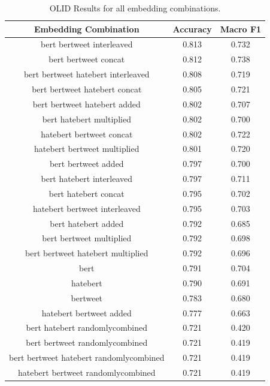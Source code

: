 \documentclass{article} %
\begin{document}
\begin{table}[htbp]
\begin{center}
    \begin{tabular}{|c|c|c|}
    \hline
    Embedding Combination & Accuracy & Macro F1\\
    \hline \hline
    bert bertweet interleaved                &     0.813 &     0.732 \\ \hline
    bert bertweet concat                     &     0.812 &     0.738 \\ \hline
    bert bertweet hatebert interleaved       &     0.808 &     0.719 \\ \hline
    bert bertweet hatebert concat            &     0.805 &     0.721 \\ \hline
    bert bertweet hatebert added             &     0.802 &     0.707 \\ \hline
    bert hatebert multiplied                 &     0.802 &     0.700 \\ \hline
    hatebert bertweet concat                 &     0.802 &     0.722 \\ \hline
    hatebert bertweet multiplied             &     0.801 &     0.720 \\ \hline
    bert bertweet added                      &     0.797 &     0.700 \\ \hline
    bert hatebert interleaved                &     0.797 &     0.711 \\ \hline
    bert hatebert concat                     &     0.795 &     0.702 \\ \hline
    hatebert bertweet interleaved            &     0.795 &     0.703 \\ \hline
    bert hatebert added                      &     0.792 &     0.685 \\ \hline
    bert bertweet multiplied                 &     0.792 &     0.698 \\ \hline
    bert bertweet hatebert multiplied        &     0.792 &     0.696 \\ \hline
    bert                                     &     0.791 &     0.704 \\ \hline
    hatebert                                 &     0.790 &     0.691 \\ \hline
    bertweet                                 &     0.783 &     0.680 \\ \hline
    hatebert bertweet added                  &     0.777 &     0.663 \\ \hline
    bert hatebert randomlycombined           &     0.721 &     0.420 \\ \hline
    bert bertweet randomlycombined           &     0.721 &     0.419 \\ \hline
    bert bertweet hatebert randomlycombined  &     0.721 &     0.419 \\ \hline
    hatebert bertweet randomlycombined       &     0.721 &     0.419 \\ \hline
    \end{tabular}
    \caption{OLID Results for all embedding combinations.}
    \label{resultsTable:olid-full-results}
\end{center}
\end{table}
\end{document}
